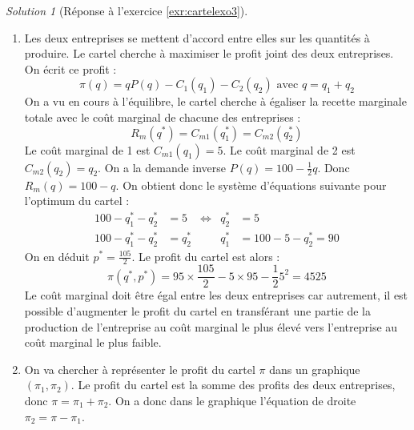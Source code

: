 \documentclass[
]{book}
\theoremstyle{definition}
\theoremstyle{definition}
\theoremstyle{definition}
\theoremstyle{definition}
\theoremstyle{remark}
\newtheorem*{solution}{Solution}
\begin{document}
\begin{solution}[Réponse à l'exercice \ref{exr:cartelexo3}]
\begin{enumerate}
\begin{align*}
  &=-\frac{3}{2}q_2+\frac{105}{2}
  \end{align*}
  En utilisant la condition du premier ordre, on a donc :
  \[-\frac{3}{2}q_2^*+\frac{105}{2}=0\Leftrightarrow q_2^*=35\]
  On en déduit \(q_1^*=95-\frac{1}{2}35=\frac{155}{2}\), donc \(q^*=\frac{225}{2}\) et \(p^*=\frac{175}{4}\).
  Les profits sont donc :
  \begin{gather*}
  \pi_1=\frac{155}{2}\times \frac{175}{4}-5\times\frac{155}{2}=\frac{155^2}{8}\approx 3003\\
  \pi_2=\frac{175}{4}\times 35-\frac{1}{2}35^2=918,75
  \end{gather*}
  Si on regarde les profits dans les deux cas, on constate qu'il est plus intéressant pour chaque entreprise d'être leader.
  Dans ce cas, l'entreprise 1 choisit de produire \(q_1=\frac{280}{3}\) et l'entreprise 2 choisit \(q_2=35\).
  Cette situation est instable, en effet, si 2 choisit la quantité \(q_2=35\), alors la meilleure réponse de 1 est de choisir suivant sa fonction de réaction \(q_1=95-\frac{1}{2}\times35=\frac{165}{2}\neq\frac{280}{3}\).
  En fait, la seule situation stable est la situation de Cournot.
\item
  Les deux entreprises se mettent d'accord entre elles sur les quantités à produire.
  Le cartel cherche à maximiser le profit joint des deux entreprises.
  On écrit ce profit :
  \[\pi(q)=qP(q)-C_1(q_1)-C_2(q_2)\text{ avec }q=q_1+q_2\]
  On a vu en cours à l'équilibre, le cartel cherche à égaliser la recette marginale totale avec le coût marginal de chacune des entreprises :
  \[R_m(q^*)=C_{m1}(q_1^*)=C_{m2}(q_2^*)\]
  Le coût marginal de 1 est \(C_{m1}(q_1)=5\).
  Le coût marginal de 2 est \(C_{m2}(q_2)=q_2\).
  On a la demande inverse \(P(q)=100-\frac{1}{2}q\).
  Donc \(R_m(q)=100-q\).
  On obtient donc le système d'équations suivante pour l'optimum du cartel :
  \begin{align*}
  100-q_1^*-q_2^*&=5&\Leftrightarrow& q_2^*&=5\\
  100-q_1^*-q_2^*&=q_2^*&&q_1^*&=100-5-q_2^*=90
  \end{align*}
  On en déduit \(p^*=\frac{105}{2}\).
  Le profit du cartel est alors :
  \[\pi(q^*, p^*)=95\times \frac{105}{2}-5\times 95-\frac{1}{2}5^2=4525\]
  Le coût marginal doit être égal entre les deux entreprises car autrement, il est possible d'augmenter le profit du cartel en transférant une partie de la production de l'entreprise au coût marginal le plus élevé vers l'entreprise au coût marginal le plus faible.
\item
  On va chercher à représenter le profit du cartel \(\pi\) dans un graphique \((\pi_1, \pi_2)\).
  Le profit du cartel est la somme des profits des deux entreprises, donc \(\pi=\pi_1+ \pi_2\).
  On a donc dans le graphique l'équation de droite \(\pi_2=\pi- \pi_1\).
\end{enumerate}


\end{solution}
\end{document}
